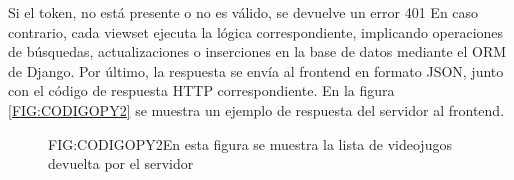 
Si el token, no está presente o no es válido, se devuelve un error 401
En caso contrario, cada viewset ejecuta la lógica correspondiente, implicando operaciones de búsquedas, actualizaciones o inserciones en 
la base de datos mediante el ORM de Django. Por último, la respuesta
se envía al frontend en formato JSON, junto con el código de respuesta HTTP correspondiente. En la figura \ref{FIG:CODIGOPY2} se muestra 
un ejemplo de respuesta del servidor al frontend.

\begin{figure}[Respuesta del servidor]{FIG:CODIGOPY2}{En esta figura se muestra la lista de videojugos devuelta por el servidor}
\end{figure}
